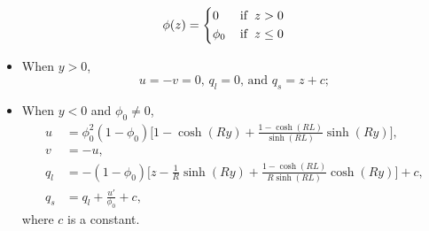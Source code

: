 \documentclass[usenames,dvipsnames,letterpaper,landscape,final]{slides}
\theoremstyle{definition}
\begin{document}
\begin{myslide}

					 \begin{equation*}\label{eq:phidiscon}
								\phi(z) = \left \{
										  \begin{alignedat}{2}
													 &0 \hspace{0.6cm} &&\text{if}\hspace{0.2cm}  z> 0\\
													 &\phi_0 \hspace{0.4cm} &&\text{if}\hspace{0.2cm} z\leq 0
										  \end{alignedat}
										  \right.
					 \end{equation*}

					 \begin{itemize}
								\item When $y>0$,
										  \begin{equation*}
										  u=-v=0,
													 \, q_l = 0,\,\text{and}\,\, q_s = z + c;
										  \end{equation*}
								\item When $y<0$ and $\phi_0 \neq 0$,
					 \begin{equation*}
								\begin{aligned}
										  u &= \phi_0^2(1-\phi_0) \bigg[1 - \cosh(Ry) + \frac{1 - \cosh{(RL)}}{\sinh{(RL)}}\sinh{(Ry)} \bigg],\\
								 v &= -u, \\
										  q_l &= -(1-\phi_0)\bigg[z - \frac{1}{R}\sinh(Ry) + \frac{1-\cosh(RL)}{R\sinh(RL)}\cosh(Ry)\bigg] + c,\\
										  q_s &= q_l + \frac{u'}{\phi_0} + c,
								\end{aligned}
					 \end{equation*}
                where $c$ is a constant.
                \end{itemize}

\end{myslide}
\end{document}
